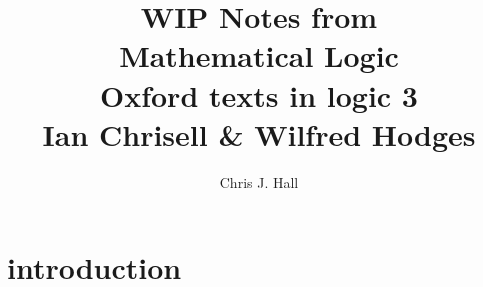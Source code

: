 \documentclass[a4paper, titlepage]{report}
\begin{document}
\newcommand{\RULE}[4]{
  {
  \iffalse
    TODO FIXME automate adding to rules sections
  \fi
  \bigskip
  \subsection{
    \texorpdfstring{
      \uppercase{#1 rule (#2 rule)}
    }{
      #1 rule (#2 rule)
    }
  }
  from page #3 \\
  \indent
  #4
  }
}

\newcommand{\EXERCISE}[4]{
  {
  \iffalse
    TODO FIXME automate adding to exercises list?
  \fi
  \bigskip
  \subsection{
    \texorpdfstring{
      Exercise #1
    }{
      Exercise #1
    }
  }
  from page #2 \\
  \indent
  #3 \\
  \indent
  #4
  }
}


\begin{titlepage}
\title {WIP Notes from \\ Mathematical Logic \\ Oxford texts in logic 3 \\ Ian Chrisell \& Wilfred Hodges}
\author {Chris J. Hall}
\maketitle
\end{titlepage}

\setcounter{tocdepth}{2}
\setcounter{secnumdepth}{1}
\tableofcontents


\newpage
{}

\chapter{introduction}
\end{document}
